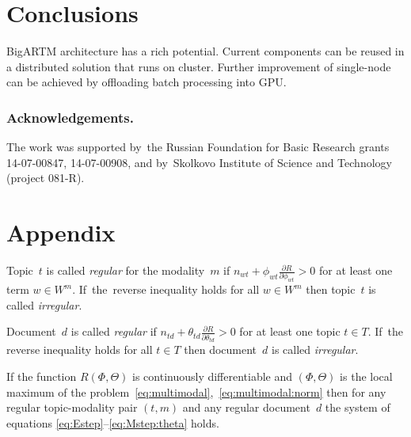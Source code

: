 \documentclass[russian]{llncs}
\begin{document}
\section{Conclusions}
\label{sec:Conclusions}

BigARTM architecture has a rich potential.
Current components can be reused in a distributed solution that runs on cluster.
Further improvement of single-node can be achieved by offloading batch processing into GPU.

\bigskip
\subsubsection*{Acknowledgements.}
    The work was supported by~the Russian Foundation for Basic Research grants 14-07-00847, 14-07-00908,
    and by~Skolkovo Institute of Science and Technology (project 081-R).


%



\section*{Appendix}

Topic~$t$ is called \emph{regular} for the modality~$m$
if ${n_{wt} + \phi_{wt} \frac{\partial R}{\partial \phi_{wt}} > 0}$
for at least one term ${w\in W^m}$.
If~the~reverse inequality holds for all ${w\in W^m}$ then
topic~$t$ is called \emph{irregular}.

Document~$d$ is called \emph{regular}
if ${n_{td} + \theta_{td} \frac{\partial R}{\partial \theta_{td}} > 0}$
for at least one topic ${t\in T}$.
If~the reverse inequality holds for all ${t\in T}$ then
document~$d$ is called \emph{irregular}.

\begin{theorem}
\label{th:multimodal}
    If the function $R(\Phi,\Theta)$ is continuously differentiable
    and $(\Phi,\Theta)$ is the local maximum
    of the problem~\eqref{eq:multimodal},~\eqref{eq:multimodal:norm}
    then for any regular topic-modality pair $(t,m)$ and any regular document~$d$
    the system of equations \eqref{eq:Estep}--\eqref{eq:Mstep:theta} holds.
\end{theorem}
\end{document}
